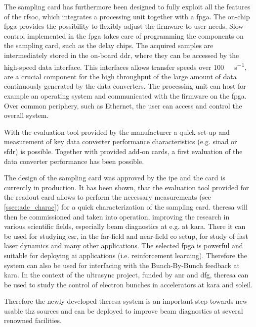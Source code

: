 The sampling card has furthermore been designed to fully exploit all the features of the \gls{rfsoc}, which integrates a processing unit together with a \gls{fpga}. 
The on-chip \gls{fpga} provides the possibility to flexibly adjust the firmware to user needs. 
Slow-control implemented in the \gls{fpga} takes care of programming the components on the sampling card, such as the delay chips.
The acquired samples are intermediately stored in the on-board \gls{ddr}, where they can be accessed by the high-speed data interface.
This interfaces allows transfer speeds over \SI{100}{\giga\bits\per\second}, are a crucial component for the high throughput of the large amount of data continuously generated by the data converters.
The processing unit can host for example an operating system and communicated with the firmware on the \gls{fpga}.
Over common periphery, such as Ethernet, the user can access and control the overall system.

With the evaluation tool provided by the manufacturer a quick set-up and measurement of key data converter performance characteristics (e.g. \gls{sinad} or \gls{sfdr}) is possible. 
Together with provided add-on cards, a first evaluation of the data converter performance has been possible.  %

The design of the sampling card was approved by the \gls{ipe} and the card is currently in production.
It has been shown, that the evaluation tool provided for the readout card allows to perform the necessary measurements (see \autoref{ssec:adc_charac}) for a quick characterization of the sampling card.
\gls{theresa} will then be commissioned and taken into operation, improving the research in various scientific fields, especially beam diagnostics at e.g. at \gls{kara}. 
There it can be used for studying \gls{csr}, in the far-field and near-field \gls{eo} setup, for study of fast laser dynamics and many other applications.
The selected \gls{fpga} is powerful and suitable for deploying \gls{ai} applications (i.e. reinforcement learning).
Therefore the system can also be used for interfacing with the Bunch-By-Bunch feedback at \gls{kara}.
In the context of the \gls{ultrasync} project, funded by \gls{anr} and \gls{dfg}, \gls{theresa} can be used to study the control of electron bunches in accelerators at \gls{kara} and \gls{soleil}. 

Therefore the newly developed \gls{theresa} system is an important step towards new usable \gls{thz} sources and can be deployed to improve beam diagnostics at several renowned facilities. 
  

